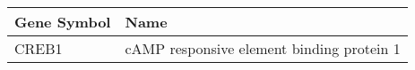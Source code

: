 \begin{tabular}{ll}
\toprule
Gene Symbol &                                      Name \\
\midrule
      CREB1 & cAMP responsive element binding protein 1 \\
\bottomrule
\end{tabular}

